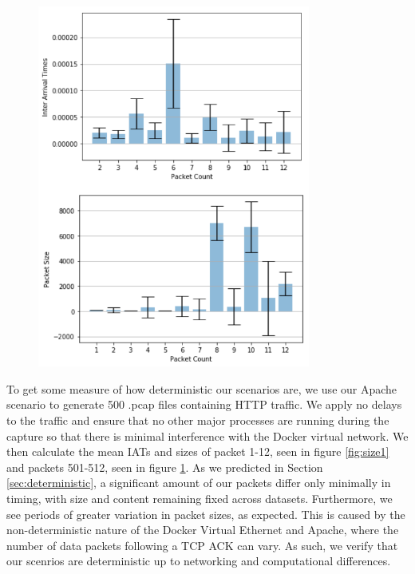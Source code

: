\documentclass[msc,deptreport, cs]{infthesis} %
\begin{document}
\begin{figure}[H]
\begin{minipage}{0.5\textwidth}
        \includegraphics[width=0.8\textwidth]{time_variation_500.png} %
        \caption{}
        \label{fig:size501}
    \end{minipage}
\end{figure}

To get some measure of how deterministic our scenarios are, we use our Apache scenario to generate 500 .pcap files containing  HTTP traffic. We apply no delays to the traffic and ensure that no other major processes are running during the capture so that there is minimal interference with the Docker virtual network. We then calculate the mean IATs and sizes of packet 1-12, seen in figure \ref{fig:size1} and packets 501-512, seen in figure \ref{fig:size501}. As we predicted in Section \ref{sec:deterministic}, a significant amount of our packets differ only minimally in timing, with size and content remaining fixed across datasets. Furthermore, we see periods of greater variation in packet sizes, as expected. This is caused by the non-deterministic nature of the Docker Virtual Ethernet and Apache, where the number of data packets following a TCP ACK can vary. As such, we verify that our scenrios are deterministic up to networking and computational differences.
\end{document}
